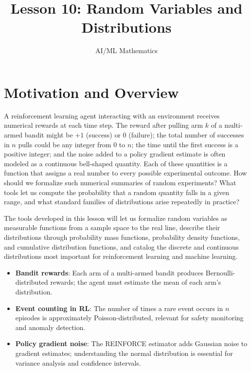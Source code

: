 \documentclass[11pt,a4paper]{article}
\title{Lesson 10: Random Variables and Distributions}
\author{AI/ML Mathematics}
\date{}
\begin{document}
\maketitle
\tableofcontents
\newpage


\section{Motivation and Overview}
\label{sec:motivation}

A reinforcement learning agent interacting with an environment receives
numerical rewards at each time step. The reward after pulling arm $k$ of a
multi-armed bandit might be $+1$ (success) or $0$ (failure); the total
number of successes in $n$ pulls could be any integer from $0$ to $n$; the
time until the first success is a positive integer; and the noise added to
a policy gradient estimate is often modeled as a continuous bell-shaped
quantity. Each of these quantities is a function that assigns a real number
to every possible experimental outcome. How should we formalize such
numerical summaries of random experiments? What tools let us compute the
probability that a random quantity falls in a given range, and what
standard families of distributions arise repeatedly in practice?

The tools developed in this lesson will let us formalize random variables
as measurable functions from a sample space to the real line, describe
their distributions through probability mass functions, probability
density functions, and cumulative distribution functions, and catalog the
discrete and continuous distributions most important for reinforcement
learning and machine learning.

\begin{rlconnection}[title={Why Random Variables and Distributions
    Matter for RL/ML}]
\begin{itemize}[nosep]
    \item \textbf{Bandit rewards}: Each arm of a multi-armed bandit
    produces Bernoulli-distributed rewards; the agent must estimate the
    mean of each arm's distribution.
    \item \textbf{Event counting in RL}: The number of times a rare event
    occurs in $n$ episodes is approximately Poisson-distributed, relevant
    for safety monitoring and anomaly detection.
    \item \textbf{Policy gradient noise}: The REINFORCE estimator adds
    Gaussian noise to gradient estimates; understanding the normal
    distribution is essential for variance analysis and confidence
    intervals.
\end{itemize}
\end{rlconnection}
\end{document}
